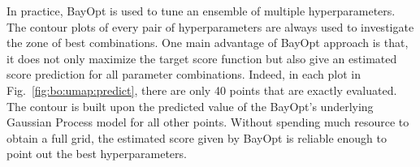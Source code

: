 In practice, BayOpt is used to tune an ensemble of multiple hyperparameters.
The contour plots of every pair of hyperparameters are always used to investigate the zone of best combinations.
One main advantage of BayOpt approach is that, it does not only maximize the target score function but also give an estimated score prediction for all parameter combinations.
Indeed, in each plot in Fig.~\ref{fig:bo:umap:predict}, there are only 40 points that are exactly evaluated.
The contour is built upon the predicted value of the BayOpt's underlying Gaussian Process model for all other points.
Without spending much resource to obtain a full grid, the estimated score given by BayOpt is reliable enough to point out the best hyperparameters.






